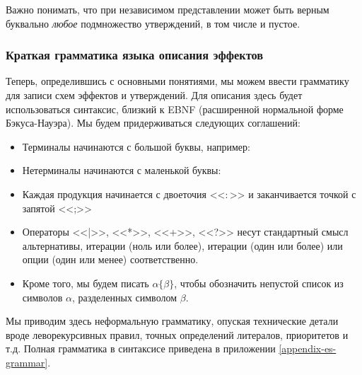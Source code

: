 Важно понимать, что при независимом представлении может быть верным буквально \emph{любое} подмножество утверждений, в том числе и пустое.




\subsubsection{Краткая грамматика языка описания эффектов}

Теперь, определившись с основными понятиями, мы можем ввести грамматику для записи схем эффектов и утверждений. 
Для описания здесь будет использоваться синтаксис, близкий к EBNF (расширенной нормальной форме Бэкуса-Науэра). Мы будем придерживаться следующих соглашений:

\begin{itemize}
    \item Терминалы начинаются с большой буквы, например: 
    
    \item Нетерминалы начинаются с маленькой буквы: 
    
    \item Каждая продукция начинается с двоеточия <<$\colon$>> и заканчивается точкой с запятой <<;>>
    
    \item Операторы <<|>>, <<*>>, <<+>>, <<?>> несут стандартный смысл альтернативы, итерации (ноль или более), итерации (один или более) или опции (один или менее) соответственно.
    
    \item Кроме того, мы будем писать $\alpha \{ \beta \}$, чтобы обозначить непустой список из символов $\alpha$, разделенных символом $\beta$. 
\end{itemize}

Мы приводим здесь неформальную грамматику, опуская технические детали вроде леворекурсивных правил, точных определений литералов, приоритетов и т.д.  Полная грамматика в синтаксисе  приведена в приложении \ref{appendix-es-grammar}.


